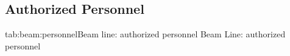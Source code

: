 \begin{safetyen}{10}{10}
\section{ Authorized Personnel}
\end{safetyen}

\begin{namestab}{tab:beam:personnel}{Beam line: authorized personnel}{%
   Beam Line: authorized personnel}
\end{namestab}





